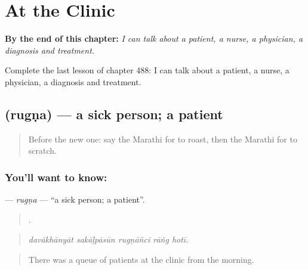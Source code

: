 
\chapter{At the Clinic}
\label{ch:mr-at-the-clinic}

\begin{chapteropening}
\textbf{By the end of this chapter:} \emph{I can talk about a patient, a nurse, a physician, a diagnosis and treatment.}

Complete the last lesson of chapter 488: I can talk about a patient, a nurse, a physician, a diagnosis and treatment.
\end{chapteropening}

\section[\texorpdfstring{\mr{रुग्ण} (rugṇa)}{रुग्ण (rugṇa)}]{ (rugṇa) — a sick person; a patient}

\label{lesson:MR-C488-rugna}



\begin{quote}
Before the new one: say the Marathi for to roast, then the Marathi for to scratch.
\end{quote}

\subsection*{You'll want to know: }
\textbf{} — \emph{rugṇa} — \textquotedblleft{}a sick person; a patient\textquotedblright{}.

\begin{quote}
    .
\end{quote}

\begin{quote}
\emph{davākhānyāt sakāḷpāsūn rugṇāñcī rāṅg hotī.}
\end{quote}

\begin{quote}
There was a queue of patients at the clinic from the morning.
\end{quote}

